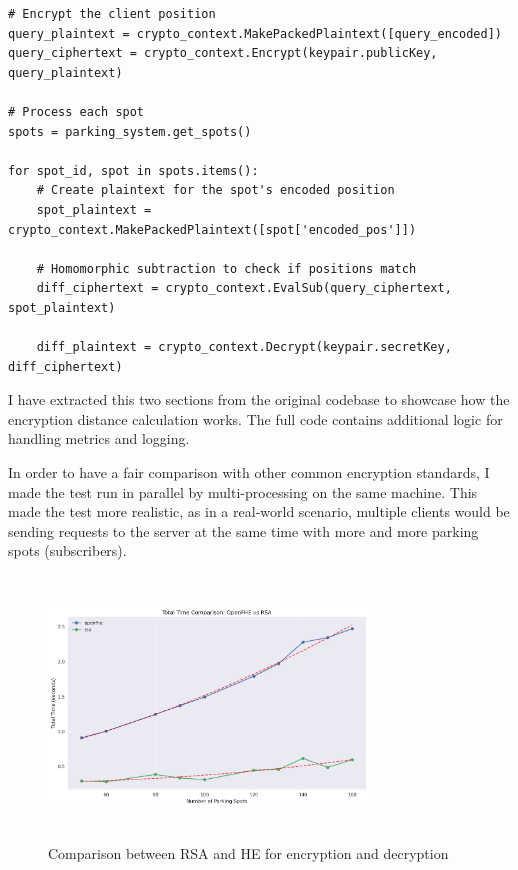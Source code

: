\begin{lstlisting}[caption={Computing distances using Homomorphic Encryption}, label={lst:compute-distances}]
# Encrypt the client position
query_plaintext = crypto_context.MakePackedPlaintext([query_encoded])
query_ciphertext = crypto_context.Encrypt(keypair.publicKey, query_plaintext)

# Process each spot
spots = parking_system.get_spots()

for spot_id, spot in spots.items():
    # Create plaintext for the spot's encoded position
    spot_plaintext = crypto_context.MakePackedPlaintext([spot['encoded_pos']])
    
    # Homomorphic subtraction to check if positions match
    diff_ciphertext = crypto_context.EvalSub(query_ciphertext, spot_plaintext)
                
    diff_plaintext = crypto_context.Decrypt(keypair.secretKey, diff_ciphertext)

\end{lstlisting}

I have extracted this two sections from the original codebase to showcase how the encryption distance calculation works. The full code contains additional logic for handling metrics and logging.

In order to have a fair comparison with other common encryption standards, I made the test run in parallel by multi-processing on the same machine. This made the test more realistic, as in a real-world scenario, multiple clients would be sending requests to the server at the same time with more and more parking spots (subscribers).

\begin{figure}[h]
    \centering
    \includegraphics[width=8.5cm,height=7cm]{img/total_time_comparison.png}
    \caption{Comparison between RSA and HE for encryption and decryption}
    \label{fig:he-vs-rsa}
\end{figure}

